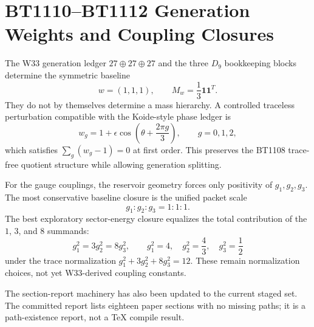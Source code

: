 \section{BT1110--BT1112 Generation Weights and Coupling Closures}
\label{sec:bt1110-bt1112-weight-closure-report}

The W33 generation ledger $27\oplus27\oplus27$ and the three $D_9$ bookkeeping blocks determine the symmetric baseline
\[
w=(1,1,1),
\qquad
M_w=\frac13\mathbf 1\mathbf 1^T.
\]
They do not by themselves determine a mass hierarchy.  A controlled traceless perturbation compatible with the Koide-style phase ledger is
\[
w_g=1+\epsilon\cos\left(\theta+\frac{2\pi g}{3}\right),
\qquad g=0,1,2,
\]
which satisfies $\sum_g(w_g-1)=0$ at first order.  This preserves the BT1108 trace-free quotient structure while allowing generation splitting.

For the gauge couplings, the reservoir geometry forces only positivity of $g_1,g_2,g_3$.  The most conservative baseline closure is the unified packet scale
\[
g_1:g_2:g_3=1:1:1.
\]
The best exploratory sector-energy closure equalizes the total contribution of the $1$, $3$, and $8$ summands:
\[
g_1^2=3g_2^2=8g_3^2,
\qquad
 g_1^2=4,\quad g_2^2=\frac43,\quad g_3^2=\frac12
\]
under the trace normalization $g_1^2+3g_2^2+8g_3^2=12$.  These remain normalization choices, not yet W33-derived coupling constants.

The section-report machinery has also been updated to the current staged set.  The committed report lists eighteen paper sections with no missing paths; it is a path-existence report, not a TeX compile result.
